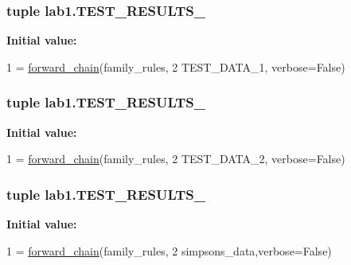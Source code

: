 \subsubsection[{T\+E\+S\+T\+\_\+\+R\+E\+S\+U\+L\+T\+S\+\_\+1}]{\setlength{\rightskip}{0pt plus 5cm}tuple lab1.\+T\+E\+S\+T\+\_\+\+R\+E\+S\+U\+L\+T\+S\+\_}\label{namespacelab1_a12138b8a907a9039b6a801459bef9663}
{\bfseries Initial value\+:}
\begin{DoxyCode}
1 = \hyperlink{namespaceproduction_af279b12f495c76be9424cb6cf0fa014f}{forward\_chain}(family\_rules, 
2                                TEST\_DATA\_1, verbose=\textcolor{keyword}{False})
\end{DoxyCode}
\hypertarget{namespacelab1_a480d9e2bd857c96c33bcb061723a5d65}{}
\subsubsection[{T\+E\+S\+T\+\_\+\+R\+E\+S\+U\+L\+T\+S\+\_\+2}]{\setlength{\rightskip}{0pt plus 5cm}tuple lab1.\+T\+E\+S\+T\+\_\+\+R\+E\+S\+U\+L\+T\+S\+\_}\label{namespacelab1_a480d9e2bd857c96c33bcb061723a5d65}
{\bfseries Initial value\+:}
\begin{DoxyCode}
1 = \hyperlink{namespaceproduction_af279b12f495c76be9424cb6cf0fa014f}{forward\_chain}(family\_rules, 
2                                TEST\_DATA\_2, verbose=\textcolor{keyword}{False})
\end{DoxyCode}
\hypertarget{namespacelab1_a1337489874302ba903588b64b2d578ad}{}
\subsubsection[{T\+E\+S\+T\+\_\+\+R\+E\+S\+U\+L\+T\+S\+\_\+6}]{\setlength{\rightskip}{0pt plus 5cm}tuple lab1.\+T\+E\+S\+T\+\_\+\+R\+E\+S\+U\+L\+T\+S\+\_}\label{namespacelab1_a1337489874302ba903588b64b2d578ad}
{\bfseries Initial value\+:}
\begin{DoxyCode}
1 = \hyperlink{namespaceproduction_af279b12f495c76be9424cb6cf0fa014f}{forward\_chain}(family\_rules,
2                                simpsons\_data,verbose=\textcolor{keyword}{False})
\end{DoxyCode}
\hypertarget{namespacelab1_a03f037dc8135fd5ee9d98bf9e786edbc}{}
